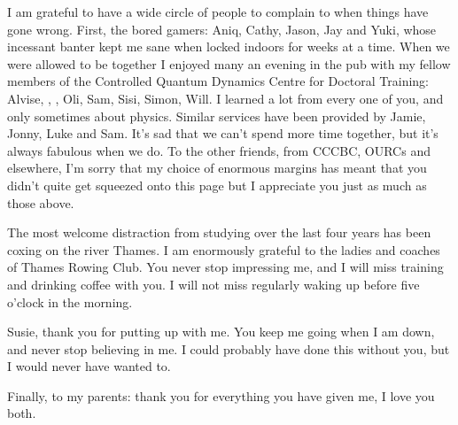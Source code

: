 \begin{singlespace}
I am grateful to have a wide circle of people to complain to when things have
gone wrong.  First, the bored gamers: Aniq, Cathy, Jason, Jay and Yuki, whose
incessant banter kept me sane when locked indoors for weeks at a time. When we
were allowed to be together I enjoyed many an evening in the pub with my fellow
members of the Controlled Quantum Dynamics Centre for Doctoral Training:
Alvise, , , Oli, Sam, Sisi, Simon, Will. I learned a lot
from every one of you, and only sometimes about physics. Similar services have
been provided by Jamie, Jonny, Luke and Sam. It's sad that we can't spend more
time together, but it's always fabulous when we do. To the other
friends, from CCCBC, OURCs and elsewhere, I'm sorry that my choice of enormous
margins has meant that you didn't quite get squeezed onto this page but I
appreciate you just as much as those above.

The most welcome distraction from studying over the last four years has been
coxing on the river Thames. I am enormously grateful to the ladies and coaches
of Thames Rowing Club. You never stop impressing me, and I will miss training
and drinking coffee with you. I will not miss regularly waking up before five
o'clock in the morning.

Susie, thank you for putting up with me. You keep me going when I am down,
and never stop believing in me. I could probably have done this without you,
but I would never have wanted to.

Finally, to my parents: thank you for everything you have given me, I love you
both.
\end{singlespace}
